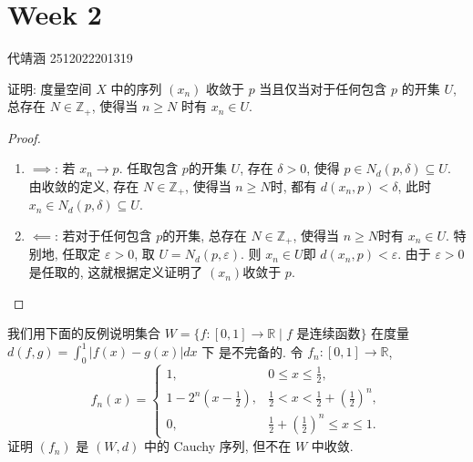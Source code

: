 \documentclass[../main.tex]{subfiles}
\begin{document}
\chapter{ Week 2 }

代靖涵 2512022201319

\begin{exercise}{}{}
  证明: 度量空间 $X$ 中的序列 $(x_n)$ 收敛于 $p$ 当且仅当对于任何包含 $p$ 的开集 $U$, 总存在 $N \in \mathbb{Z}_+$, 使得当 $n \ge N$ 时有 $x_n \in U$.
\end{exercise}
\begin{proof}
    \begin{enumerate}
        \item \(  \implies   \): 若 \(  x_{n}\to p  \). 任取包含 \(  p  \)的开集 \(  U  \), 存在 \(   \delta > 0  \), 使得 \(  p \in N_{d}\left( p, \delta  \right)\subseteq U   \). 由收敛的定义, 存在 \(  N\in \mathbb{Z} _{+ }  \), 使得当 \(  n\ge N  \)时, 都有 \(  d\left( x_{n},p \right)<  \delta    \), 此时 \(  x_{n}\in N_{d}\left( p, \delta  \right)\subseteq U   \).    
        \item \(  \impliedby   \): 若对于任何包含 \(  p  \)的开集, 总存在 \(  N\in \mathbb{Z} _{+ }  \), 使得当 \(  n\ge N  \)时有 \(  x_{n}\in U  \). 特别地, 任取定 \(   \varepsilon > 0  \),  取 \(  U= N_{d}\left( p,  \varepsilon  \right)    \). 则 \(  x_{n}\in U  \)即 \(  d\left( x_{n},p \right)<  \varepsilon    \). 由于 \(   \varepsilon > 0  \)是任取的,   这就根据定义证明了 \(  \left( x_{n} \right)   \)收敛于 \(  p  \).          
    \end{enumerate}
    
\end{proof}


\begin{exercise}{}{}
    
我们用下面的反例说明集合 $W = \{f : [0,1] \to \mathbb{R} \mid f \text{ 是连续函数}\}$ 在度量 $d(f,g) = \int_0^1 |f(x) - g(x)|dx$ 下  是不完备的. 令 $f_n : [0,1] \to \mathbb{R}$,
$$f_n(x) = \begin{cases}
1, & 0 \le x \le \frac{1}{2}, \\
1 - 2^n(x - \frac{1}{2}), & \frac{1}{2} < x < \frac{1}{2} + (\frac{1}{2})^n, \\
0, & \frac{1}{2} + (\frac{1}{2})^n \le x \le 1.
\end{cases}$$
证明 $(f_n)$ 是 $(W,d)$ 中的 Cauchy 序列, 但不在 $W$ 中收敛.
\end{exercise}
\end{document}
